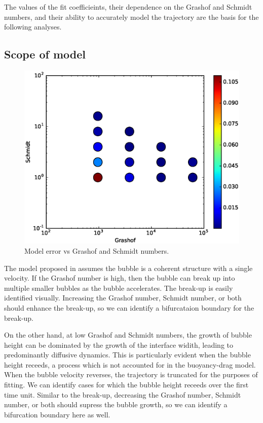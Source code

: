 The values of the fit coefficieints, their dependence on the Grashof and Schmidt numbers, and their ability to accurately model the trajectory are the basis for the following analyses.

\subsection{Scope of model}

\begin{figure}
\includegraphics[width=\columnwidth]{figs/Err-vs-Gr-Sc}
\caption{ 
  Model error vs Grashof and Schmidt numbers.
}
\end{figure}

The model proposed in  assumes the bubble is a coherent structure with a single velocity.
If the Grashof number is high, then the bubble can break up into multiple smaller bubbles as the bubble accelerates.
The break-up is easily identified visually.
Increasing the Grashof number, Schmidt number, or both should enhance the break-up, so we can identify a bifurcataion boundary for the break-up.

On the other hand, at low Grashof and Schmidt numbers, the growth of bubble height can be dominated by the growth of the interface widith, leading to predominantly diffusive dynamics.
This is particularly evident when the bubble height receeds, a process which is not accounted for in the buoyancy-drag model.
When the bubble velocity reverses, the trajectory is truncated for the purposes of fitting.
We can identify cases for which the bubble height receeds over the first time unit.
Similar to the break-up, decreasing the Grashof number, Schmidt number, or both should supress the bubble growth, so we can identify a bifurcation boundary here as well.

